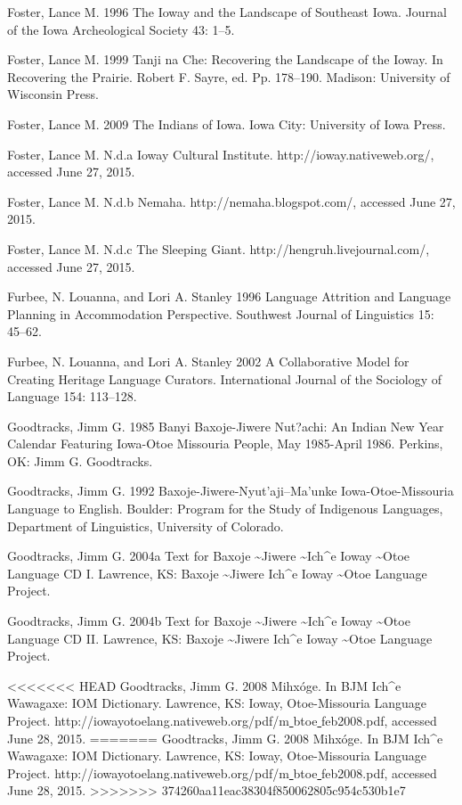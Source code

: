 \documentclass[output=paper]{LSP/langsci}
\begin{document}
\begin{reflist}
Foster, Lance M. 1996 The Ioway and the Landscape of Southeast Iowa. Journal of the Iowa Archeological Society 43: 1--5.

Foster, Lance M. 1999 Tanji na Che: Recovering the Landscape of the Ioway. In Recovering the Prairie. Robert F. Sayre, ed. Pp. 178--190. Madison: University of Wisconsin Press.

Foster, Lance M. 2009 The Indians of Iowa. Iowa City: University of Iowa Press.

Foster, Lance M. N.d.a Ioway Cultural Institute. http://ioway.nativeweb.org/, accessed June 27, 2015.

Foster, Lance M. N.d.b Nemaha. http://nemaha.blogspot.com/, accessed June 27, 2015.

Foster, Lance M. N.d.c The Sleeping Giant. http://hengruh.livejournal.com/, accessed June 27, 2015.

Furbee, N. Louanna, and Lori A. Stanley 1996 Language Attrition and Language Planning in Accommodation Perspective. Southwest Journal of Linguistics 15: 45--62.

Furbee, N. Louanna, and Lori A. Stanley 2002 A Collaborative Model for Creating Heritage Language Curators. International Journal of the Sociology of Language 154: 113--128.

Goodtracks, Jimm G. 1985 Banyi Baxoje-Jiwere Nut?achi: An Indian New Year Calendar Featuring Iowa-Otoe Missouria People, May 1985-April 1986. Perkins, OK: Jimm G. Goodtracks.

Goodtracks, Jimm G. 1992 Baxoje-Jiwere-Nyut'aji--Ma'unke Iowa-Otoe-Missouria Language to English. Boulder: Program for the Study of Indigenous Languages, Department of Linguistics, University of Colorado.

Goodtracks, Jimm G. 2004a Text for Baxoje \textasciitilde Jiwere \textasciitilde Ich\^{ }e Ioway \textasciitilde Otoe Language CD I. Lawrence, KS: Baxoje \textasciitilde Jiwere Ich\^{ }e Ioway \textasciitilde Otoe Language Project.

Goodtracks, Jimm G. 2004b Text for Baxoje \textasciitilde Jiwere \textasciitilde Ich\^{ }e Ioway \textasciitilde Otoe Language CD II. Lawrence, KS: Baxoje \textasciitilde Jiwere Ich\^{ }e Ioway \textasciitilde Otoe Language Project.

<<<<<<< HEAD
Goodtracks, Jimm G. 2008 Mihxóge. In BJM Ich\^{ }e Wawagaxe: IOM Dictionary. Lawrence, KS: Ioway, Otoe-Missouria Language Project. http://iowayotoelang.nativeweb.org/pdf/m\underline{ }btoe\underline{ }feb2008.pdf, accessed June 28, 2015.
=======
Goodtracks, Jimm G. 2008 Mihx\'oge. In BJM Ich\^{ }e Wawagaxe: IOM Dictionary. Lawrence, KS: Ioway, Otoe-Missouria Language Project. http://iowayotoelang.nativeweb.org/pdf/m\underline{ }btoe\underline{ }feb2008.pdf, accessed June 28, 2015.
>>>>>>> 374260aa11eac38304f850062805c954c530b1e7


\end{reflist}
\end{document}
